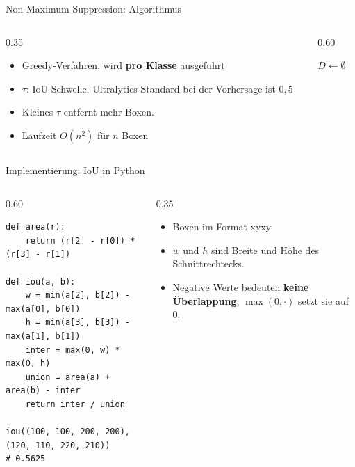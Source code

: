 \begin{frame}{Non-Maximum Suppression: Algorithmus}
\begin{columns}
\begin{column}{0.35\textwidth}
\begin{itemize}
  \item Greedy-Verfahren, wird \textbf{pro Klasse} ausgeführt
  \item $\tau$: IoU-Schwelle, Ultralytics-Standard bei der Vorhersage ist $0{,}5$
  \item Kleines $\tau$ entfernt mehr Boxen.
  \item Laufzeit $O(n^2)$ für $n$ Boxen
\end{itemize}
\end{column}
\begin{column}{0.60\textwidth}
\begin{algorithm}[H]
\footnotesize
\SetAlCapFnt{\footnotesize}
\SetAlCapNameFnt{\footnotesize}
$D \gets \emptyset$\;
\;
\caption{Non-Maximum Suppression}
\end{algorithm}
\end{column}
\end{columns}
\end{frame}

\begin{frame}[fragile]{Implementierung: IoU in Python}
\begin{columns}
\begin{column}{0.60\textwidth}
{\footnotesize
\begin{verbatim}
def area(r):
    return (r[2] - r[0]) * (r[3] - r[1])

def iou(a, b):
    w = min(a[2], b[2]) - max(a[0], b[0])
    h = min(a[3], b[3]) - max(a[1], b[1])
    inter = max(0, w) * max(0, h)
    union = area(a) + area(b) - inter
    return inter / union

iou((100, 100, 200, 200), (120, 110, 220, 210))
# 0.5625
\end{verbatim}
}
\end{column}
\begin{column}{0.35\textwidth}
\begin{itemize}
  \item Boxen im Format xyxy
  \item $w$ und $h$ sind Breite und Höhe des Schnittrechtecks.
  \item Negative Werte bedeuten \textbf{keine Überlappung}, $\max(0, \cdot)$ setzt sie auf $0$.
\end{itemize}
\end{column}
\end{columns}
\end{frame}

